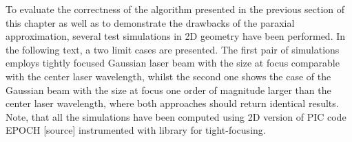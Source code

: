 To evaluate the correctness of the algorithm presented in the previous section of this chapter as well as to demonstrate the drawbacks of the paraxial approximation, several test simulations in 2D geometry have been performed. In the following text, a two limit cases are presented. The first pair of simulations employs tightly focused Gaussian laser beam with the size at focus comparable with the center laser wavelength, whilst the second one shows the case of the Gaussian beam with the size at focus one order of magnitude larger than the center laser wavelength, where both approaches should return identical results. Note, that all the simulations have been computed using 2D version of PIC code EPOCH [source] instrumented with library for tight-focusing.

\begin{figure}[h!]
	\centering
	\hspace{2mm}
	\\

\end{figure}
